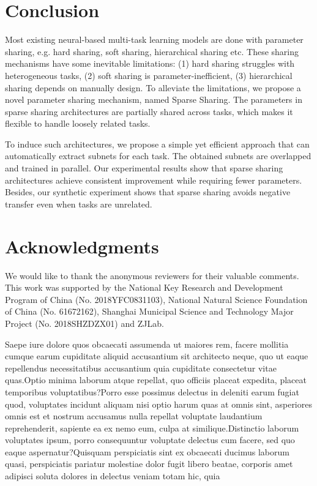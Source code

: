 \documentclass[letterpaper]{article} %
\begin{document}
\vspace{-2.67mm}
\section{Conclusion}
Most existing neural-based multi-task learning models are done with parameter sharing, e.g. hard sharing, soft sharing, hierarchical sharing etc. These sharing mechanisms have some inevitable limitations: (1) hard sharing struggles with heterogeneous tasks, (2) soft sharing is parameter-inefficient, (3) hierarchical sharing depends on manually design. To alleviate the limitations, we propose a novel parameter sharing mechanism, named Sparse Sharing. The parameters in sparse sharing architectures are partially shared across tasks, which makes it flexible to handle loosely related tasks.

To induce such architectures, we propose a simple yet efficient approach that can automatically extract subnets for each task. The obtained subnets are overlapped and trained in parallel. Our experimental results show that sparse sharing architectures achieve consistent improvement while requiring fewer parameters. Besides, our synthetic experiment shows that sparse sharing avoids negative transfer even when tasks are unrelated.

\section{Acknowledgments}
We would like to thank the anonymous reviewers for their valuable comments. This work was supported by the National Key Research and Development Program of China (No. 2018YFC0831103), National Natural Science Foundation of China (No. 61672162), Shanghai Municipal Science and Technology Major Project (No. 2018SHZDZX01) and ZJLab.


Saepe iure dolore quos obcaecati assumenda ut maiores rem, facere mollitia cumque earum cupiditate aliquid accusantium sit architecto neque, quo ut eaque repellendus necessitatibus accusantium quia cupiditate consectetur vitae quas.Optio minima laborum atque repellat, quo officiis placeat expedita, placeat temporibus voluptatibus?Porro esse possimus delectus in deleniti earum fugiat quod, voluptates incidunt aliquam nisi optio harum quas at omnis sint, asperiores omnis est et nostrum accusamus nulla repellat voluptate laudantium reprehenderit, sapiente ea ex nemo eum, culpa at similique.Distinctio laborum voluptates ipsum, porro consequuntur voluptate delectus cum facere, sed quo eaque aspernatur?Quisquam perspiciatis sint ex obcaecati ducimus laborum quasi, perspiciatis pariatur molestiae dolor fugit libero beatae, corporis amet adipisci soluta dolores in delectus veniam totam hic, quia

\end{document}
